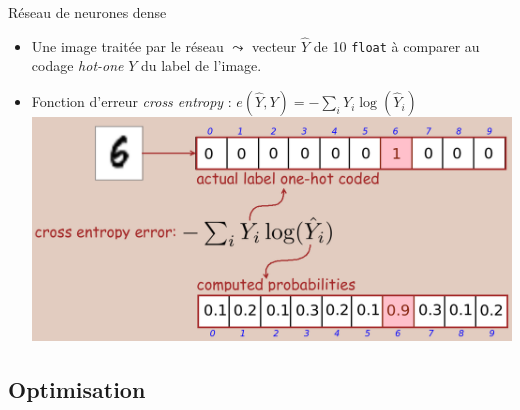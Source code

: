 \documentclass[10pt,serif,mathserif,compress,hyperref={colorlinks}]{beamer}
\begin{document}
\begin{frame}{Réseau de neurones dense}

  \begin{tcolorbox}[title=Fonction d'erreur : {\em Cross entropy error}]  

    \begin{itemize}
    \item Une image traitée par le réseau $\leadsto$ vecteur $\hat{Y}$ de 10 \texttt{float} à comparer au codage {\em hot-one} $Y$ du label de l'image.
    \item Fonction d'erreur {\em cross entropy} : $e(\hat{Y},Y)=-\sum_i Y_i\log(\hat{Y}_i)$\\[3mm]
      \includegraphics[width=.9\textwidth]{images/CrossEntropy-error-jlc.png}
    \end{itemize}

  \end{tcolorbox}
  
\end{frame}

\subsection{Optimisation}
\end{document}
